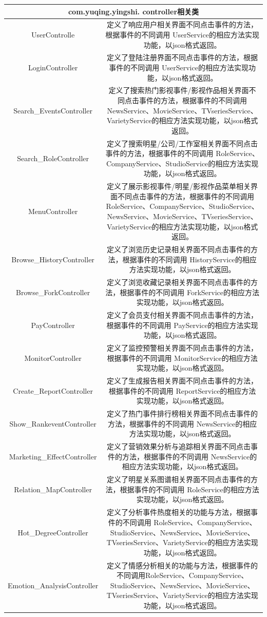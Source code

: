 \begin{tabular}{|c|c|} 
\hline 
\multicolumn{2}{|c|}{com.yuqing.yingshi. controller相关类} \\ 
\hline 
UserControlle&定义了响应用户相关界面不同点击事件的方法，根据事件的不同调用 UserService的相应方法实现功能，以json格式返回。\\
LoginController&定义了登陆注册界面不同点击事件的方法，根据事件的不同调用 UserService的相应方法实现功能，以json格式返回。\\
Search\_EventsController&定义了搜索热门影视事件/影视作品相关界面不同点击事件的方法，根据事件的不同调用 NewsService、MovieService、TVseriesService、VarietyService的相应方法实现功能，以json格式返回。\\
Search\_RoleController&定义了搜索明星/公司/工作室相关界面不同点击事件的方法，根据事件的不同调用 RoleService、CompanyService、StudioService的相应方法实现功能，以json格式返回。\\
MenuController&定义了展示影视事件/明星/影视作品菜单相关界面不同点击事件的方法，根据事件的不同调用 RoleService、CompanyService、StudioService、NewsService、MovieService、TVseriesService、VarietyService的相应方法实现功能，以json格式返回。\\
Browse\_HistoryController&定义了浏览历史记录相关界面不同点击事件的方法，根据事件的不同调用 HistoryService的相应方法实现功能，以json格式返回。\\
Browse\_ForkController&定义了浏览收藏记录相关界面不同点击事件的方法，根据事件的不同调用 ForkService的相应方法实现功能，以json格式返回。\\
PayController&定义了会员支付相关界面不同点击事件的方法，根据事件的不同调用 PayService的相应方法实现功能，以json格式返回。\\
MonitorController&定义了监控预警相关界面不同点击事件的方法，根据事件的不同调用 MonitorService的相应方法实现功能，以json格式返回。\\
Create\_ReportController&定义了生成报告相关界面不同点击事件的方法，根据事件的不同调用 ReportService的相应方法实现功能，以json格式返回。\\
Show\_RankeventController&定义了热门事件排行榜相关界面不同点击事件的方法，根据事件的不同调用 NewsService的相应方法实现功能，以json格式返回。\\
Marketing\_EffectController&定义了营销效果分析与追踪相关界面不同点击事件的方法，根据事件的不同调用 NewsService的相应方法实现功能，以json格式返回。\\
Relation\_MapController&定义了明星关系图谱相关界面不同点击事件的方法，根据事件的不同调用 RoleService的相应方法实现功能，以json格式返回。\\
Hot\_DegreeController&定义了分析事件热度相关的功能与方法，根据事件的不同调用 RoleService、CompanyService、StudioService、NewsService、MovieService、TVseriesService、VarietyService的相应方法实现功能，以json格式返回。\\
Emotion\_AnalysisController&定义了情感分析相关的功能与方法，根据事件的不同调用RoleService、CompanyService、StudioService、NewsService、MovieService、TVseriesService、VarietyService的相应方法实现功能，以json格式返回。\\
\hline 
\end{tabular}

